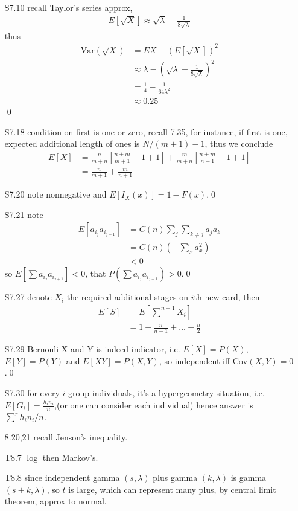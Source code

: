 \documentclass[paper=a4, fontsize=11pt]{scrartcl} %
\numberwithin{equation}{section} %
\numberwithin{figure}{section} %
\numberwithin{table}{section} %
\def \cov {\text{Cov}}
\def \var {\text{Var}}
\begin{document}
\begin{itemize}
	\item[S7.10] recall Taylor's series approx,
	\begin{align}
		E[\sqrt{X}] \approx \sqrt{\lambda} - \frac{1}{8\sqrt{\lambda}}
	\end{align}
	thus
	\begin{align}
		\var(\sqrt{X}) &= EX - (E[\sqrt{X}])^2 \\
			&\approx \lambda - (\sqrt{\lambda} - \frac{1}{8\sqrt{\lambda}})^2\\
			&= \frac{1}{4} - \frac{1}{64\lambda^2}\\
			&\approx 0.25
	\end{align}\qed
	\item[S7.18] condition on first is one or zero, recall 7.35, for instance, if first is one, expected additional length of ones is $N/(m+1)-1$, thus we conclude
	\begin{align}
		E[X] &= \frac{n}{m+n}[\frac{n+m}{m+1} -1+1] + \frac{m}{m+n}[\frac{n+m}{n+1}-1+1]\\
			&= \frac{n}{m+1}+\frac{m}{n+1}
	\end{align}
	\item[S7.20] note nonnegative and $E[I_X(x)] = 1-F(x)$.\qed
	\item[S7.21] note
	\begin{align}
		E[a_{i_j}a_{i_{j+1}}] &= C(n) \sum_j \sum_{k\neq j} a_ja_k\\
			&= C(n) (-\sum_x a_x^2)\\
			&<0
	\end{align}
	so $E[\sum a_{i_j}a_{i_{j+1}}]<0$, that $P(\sum a_{i_j}a_{i_{j+1}})>0$.\qed
	\item[S7.27] denote $X_i$ the required additional stages on $i$th new card, then
	\begin{align}
		E[S] &= E[\sum^{n-1} X_i] \\
			&=1+ \frac{n}{n-1}+\dots+\frac{n}{2}
	\end{align}
	\item[S7.29] Bernouli X and Y is indeed indicator, i.e. $E[X]=P(X)$, $E[Y]=P(Y)$ and $E[XY]=P(X,Y)$, so independent iff $\cov(X,Y)=0$.\qed
	\item[S7.30] for every $i$-group individuals, it's a hypergeometry situation, i.e. $E[G_i]=\frac{h_in_i}{n}$,(or one can consider each individual) hence answer is $\sum^r h_in_i/n$.
	\item[8.20,21] recall Jenson's inequality.
	\item[T8.7] $\log$ then Markov's.
	\item[T8.8] since independent gamma $(s,\lambda)$ plus gamma $(k,\lambda)$ is gamma $(s+k,\lambda)$, so $t$ is large, which can represent many plus, by central limit theorem, approx to normal.

\end{itemize}
\end{document}
